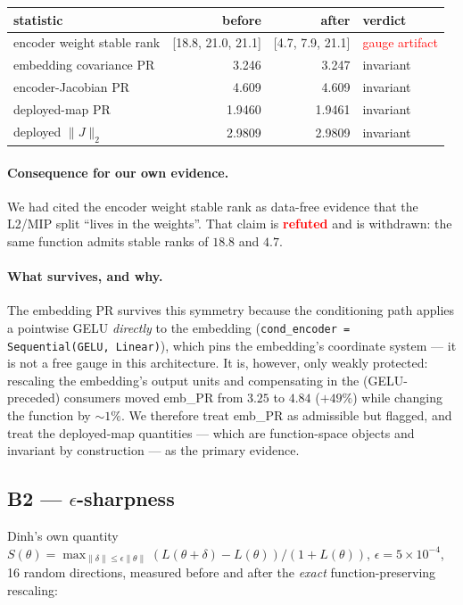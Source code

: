 \documentclass[10pt]{article}
\newcommand{\no}{\textcolor{red}{\textbf{refuted}}}
\begin{document}
\begin{center}\small
\begin{tabular}{lrrl}
\toprule
statistic & before & after & verdict \\
\midrule
encoder weight stable rank & [18.8, 21.0, 21.1] & [4.7, 7.9, 21.1] &
\textcolor{red}{gauge artifact} \\
embedding covariance PR     & 3.246 & 3.247 & invariant \\
encoder-Jacobian PR         & 4.609 & 4.609 & invariant \\
deployed-map PR             & 1.9460 & 1.9461 & invariant \\
deployed $\|J\|_2$          & 2.9809 & 2.9809 & invariant \\
\bottomrule
\end{tabular}
\end{center}

\paragraph{Consequence for our own evidence.} We had cited the encoder
weight stable rank as data-free evidence that the L2/MIP split ``lives in
the weights''. That claim is \no{} and is withdrawn: the same function
admits stable ranks of $18.8$ and $4.7$.

\paragraph{What survives, and why.} The embedding PR survives this
symmetry because the conditioning path applies a pointwise GELU
\emph{directly} to the embedding
(\texttt{cond\_encoder = Sequential(GELU, Linear)}), which pins the
embedding's coordinate system --- it is not a free gauge in this
architecture. It is, however, only weakly protected: rescaling the
embedding's output units and compensating in the (GELU-preceded) consumers
moved emb\_PR from $3.25$ to $4.84$ ($+49\%$) while changing the function
by $\sim1\%$. We therefore treat emb\_PR as admissible but flagged, and
treat the deployed-map quantities --- which are function-space objects and
invariant by construction --- as the primary evidence.

\subsection*{B2 --- $\epsilon$-sharpness}
Dinh's own quantity
$S(\theta)=\max_{\|\delta\|\le\epsilon\|\theta\|}
(L(\theta+\delta)-L(\theta))/(1+L(\theta))$, $\epsilon=5\times10^{-4}$,
16 random directions, measured before and after the \emph{exact}
function-preserving rescaling:
\end{document}
